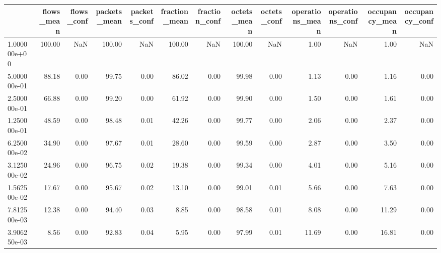 \begin{tabular}{lrrrrrrrrrrrr}
\toprule
{} &  flows\_mean &  flows\_conf &  packets\_mean &  packets\_conf &  fraction\_mean &  fraction\_conf &  octets\_mean &  octets\_conf &  operations\_mean &  operations\_conf &  occupancy\_mean &  occupancy\_conf \\
\midrule
1.000000e+00 &      100.00 &         NaN &        100.00 &           NaN &         100.00 &            NaN &       100.00 &          NaN &             1.00 &              NaN &            1.00 &             NaN \\
5.000000e-01 &       88.18 &        0.00 &         99.75 &          0.00 &          86.02 &           0.00 &        99.98 &         0.00 &             1.13 &             0.00 &            1.16 &            0.00 \\
2.500000e-01 &       66.88 &        0.00 &         99.20 &          0.00 &          61.92 &           0.00 &        99.90 &         0.00 &             1.50 &             0.00 &            1.61 &            0.00 \\
1.250000e-01 &       48.59 &        0.00 &         98.48 &          0.01 &          42.26 &           0.00 &        99.77 &         0.00 &             2.06 &             0.00 &            2.37 &            0.00 \\
6.250000e-02 &       34.90 &        0.00 &         97.67 &          0.01 &          28.60 &           0.00 &        99.59 &         0.00 &             2.87 &             0.00 &            3.50 &            0.00 \\
3.125000e-02 &       24.96 &        0.00 &         96.75 &          0.02 &          19.38 &           0.00 &        99.34 &         0.00 &             4.01 &             0.00 &            5.16 &            0.00 \\
1.562500e-02 &       17.67 &        0.00 &         95.67 &          0.02 &          13.10 &           0.00 &        99.01 &         0.01 &             5.66 &             0.00 &            7.63 &            0.00 \\
7.812500e-03 &       12.38 &        0.00 &         94.40 &          0.03 &           8.85 &           0.00 &        98.58 &         0.01 &             8.08 &             0.00 &           11.29 &            0.00 \\
3.906250e-03 &        8.56 &        0.00 &         92.83 &          0.04 &           5.95 &           0.00 &        97.99 &         0.01 &            11.69 &             0.00 &           16.81 &            0.00 \\

\end{tabular}

